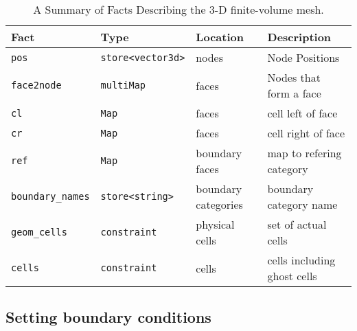 \documentclass[10pt,epsf]{book}
\begin{document}
\begin{table}[htbp]
\label{fvmfacts}
\caption{ A Summary of Facts Describing the 3-D finite-volume mesh.}
\begin{center}
  \begin{tabular}{|l|l|l|l|}
    \hline
    Fact  & Type & Location & Description\\
    \hline\hline
    {\tt pos} & {\tt store<vector3d>} & nodes & Node Positions\\
    {\tt face2node} & {\tt multiMap} & faces & Nodes that form a
    face\\
    {\tt cl} & {\tt Map} & faces & cell left of face\\
    {\tt cr} & {\tt Map} & faces & cell right of face\\
    {\tt ref} & {\tt Map} & boundary faces & map to refering category\\
    {\tt boundary\_names} & {\tt store<string>} & boundary categories & boundary category name\\
    {\tt geom\_cells} & {\tt constraint} & physical cells & set of actual cells\\
{\tt cells} & {\tt constraint} & cells & cells including ghost cells\\
    \hline
  \end{tabular}
\end{center}
\end{table}

\subsection{ Setting boundary conditions}
\end{document}
